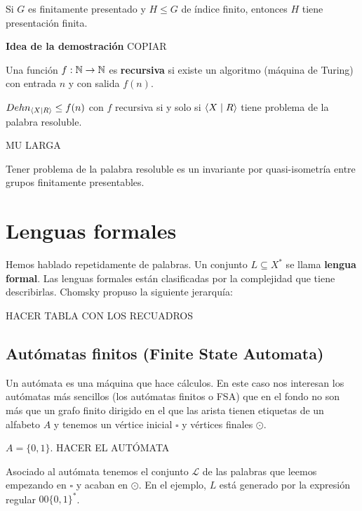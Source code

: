 \documentclass[twoside, 11pt]{article}
\begin{document}
\begin{coro}
Si $G$ es finitamente presentado y $H\leq G$ de índice finito, entonces $H$ tiene presentación finita.
\end{coro}

\textbf{Idea de la demostración}
COPIAR

\begin{defi}
Una función $f:\mathbb{N}\to\mathbb{N}$ es \textbf{recursiva} si existe un algoritmo (máquina de Turing) con entrada $n$ y con salida $f(n)$. 
\end{defi}

\begin{teorema}
$Dehn_{\langle{X\mid R}\rangle}\leq f(n)$ con $f$ recursiva si y solo si $\langle{X\mid R}\rangle$ tiene problema de la palabra resoluble. 
\end{teorema}
\begin{dem}
MU LARGA
\QED
\end{dem}

\begin{coro}
Tener problema de la palabra resoluble es un invariante por quasi-isometría entre grupos finitamente presentables. 
\end{coro}

\section{Lenguas formales}

Hemos hablado repetidamente de palabras. Un conjunto $L\subseteq X^*$ se llama \textbf{lengua formal}. Las lenguas formales están clasificadas por la complejidad que tiene describirlas. Chomsky propuso la siguiente jerarquía:

HACER TABLA CON LOS RECUADROS


\subsection{Autómatas finitos (Finite State Automata)}

Un autómata es una máquina que hace cálculos. En este caso nos interesan los autómatas más sencillos (los autómatas finitos o FSA) que en el fondo no son más que un grafo finito dirigido en el que las arista tienen etiquetas de un alfabeto $A$ y tenemos un vértice inicial $\square$ y vértices finales $\odot$.

\begin{ej}
$A=\{0,1\}$.
HACER EL AUTÓMATA

Asociado al autómata tenemos el conjunto $\mathcal{L}$ de las palabras que leemos empezando en $\square$ y acaban en $\odot$. En el ejemplo, $L$ está generado por la expresión regular $00\{0,1\}^*$.
\end{ej}
\end{document}
